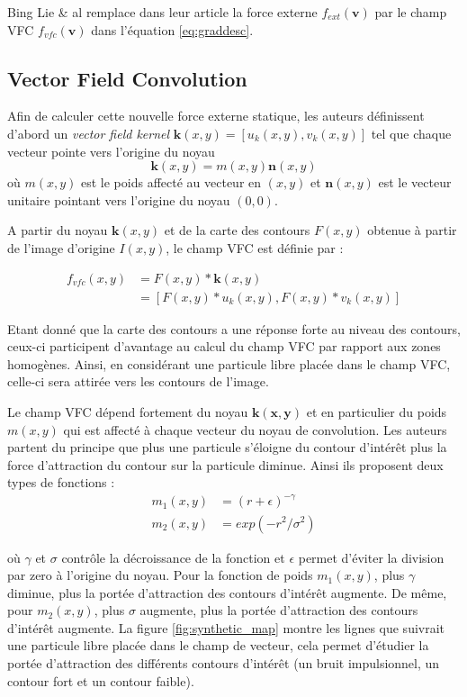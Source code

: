 Bing Lie \& al remplace dans leur article la force externe $f_{ext}(\mathbf{v})$ par le champ VFC $f_{vfc}(\mathbf{v})$ dans l'équation \ref{eq:graddesc}.

\subsection{Vector Field Convolution}

Afin de calculer cette nouvelle force externe statique, les auteurs définissent d'abord un \textit{vector field kernel} $\mathbf{k}(x,y)=[u_k(x,y),v_k(x,y)]$ tel que chaque vecteur pointe vers l'origine du noyau 
\begin{equation}
	\mathbf{k}(x,y)=m(x,y)\mathbf{n}(x,y)
\end{equation}
où $m(x,y)$ est le poids affecté au vecteur en $(x,y)$ et $\mathbf{n}(x,y)$ est le vecteur unitaire pointant vers l'origine du noyau $(0,0)$.

A partir du noyau $\mathbf{k}(x,y)$ et de la carte des contours $F(x,y)$ obtenue à partir de l'image d'origine $I(x,y)$, le champ VFC est définie par :

\begin{align*}
	f_{vfc}(x,y) & = F(x,y)*\mathbf{k}(x,y) \\
				 & = [F(x,y)*u_k(x,y),F(x,y)*v_k(x,y)]
\end{align*}

Etant donné que la carte des contours a une réponse forte au niveau des contours, ceux-ci participent d'avantage au calcul du champ VFC par rapport aux zones homogènes. Ainsi, en considérant une particule libre placée dans le champ VFC, celle-ci sera attirée vers les contours de l'image. 

Le champ VFC dépend fortement du noyau $\mathbf{k(x,y)}$ et en particulier du poids $m(x,y)$ qui est affecté à chaque vecteur du noyau de convolution. Les auteurs partent du principe que plus une particule s'éloigne du contour d'intérêt plus la force d'attraction du contour sur la particule diminue. Ainsi ils proposent deux types de fonctions :
\begin{align}
	m_1(x,y) & = (r+\epsilon)^{-\gamma} \\
	m_2(x,y) & = exp(-r^2/\sigma^2)
\end{align}

où $\gamma$ et $\sigma$ contrôle la décroissance de la fonction et $\epsilon$ permet d'éviter la division par zero à l'origine du noyau. Pour la fonction de poids $m_1(x,y)$, plus $\gamma$ diminue, plus la portée d'attraction des contours d'intérêt augmente. De même, pour $m_2(x,y)$, plus $\sigma$ augmente, plus la portée d'attraction des contours d'intérêt augmente. La figure \ref{fig:synthetic_map} montre les lignes que suivrait une particule libre placée dans le champ de vecteur, cela permet d'étudier la portée d'attraction des différents contours d'intérêt (un bruit impulsionnel, un contour fort et un contour faible).


